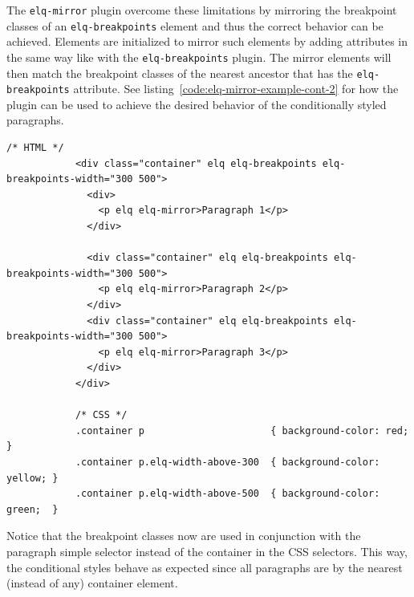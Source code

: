 \documentclass[a4paper,11pt]{kth-mag}
\newcommand{\code}[1]{\texttt{#1}}
\begin{document}
          The \code{elq-mirror} plugin overcome these limitations by mirroring the breakpoint classes of an \code{elq-breakpoints} element and thus the correct behavior can be achieved.
          Elements are initialized to mirror such elements by adding attributes in the same way like with the \code{elq-breakpoints} plugin.
          The mirror elements will then match the breakpoint classes of the nearest ancestor that has the \code{elq-breakpoints} attribute.
          See listing~\ref{code:elq-mirror-example-cont-2} for how the plugin can be used to achieve the desired behavior of the conditionally styled paragraphs.
          \begin{lstlisting}[gobble=12,caption={By using the \code{elq-mirror} plugin to overcome the limitations of CSS, the correct behavior can be achieved of the conditionally styled paragraphs.},captionpos=b,label={code:elq-mirror-example-cont-2}]
            /* HTML */
            <div class="container" elq elq-breakpoints elq-breakpoints-width="300 500">
              <div>
                <p elq elq-mirror>Paragraph 1</p>
              </div>

              <div class="container" elq elq-breakpoints elq-breakpoints-width="300 500">
                <p elq elq-mirror>Paragraph 2</p>
              </div>
              <div class="container" elq elq-breakpoints elq-breakpoints-width="300 500">
                <p elq elq-mirror>Paragraph 3</p>
              </div>
            </div>

            /* CSS */
            .container p                      { background-color: red;    }
            .container p.elq-width-above-300  { background-color: yellow; }
            .container p.elq-width-above-500  { background-color: green;  }
          \end{lstlisting}
          Notice that the breakpoint classes now are used in conjunction with the paragraph simple selector instead of the container in the CSS selectors.
          This way, the conditional styles behave as expected since all paragraphs are by the nearest (instead of any) container element.
\end{document}
